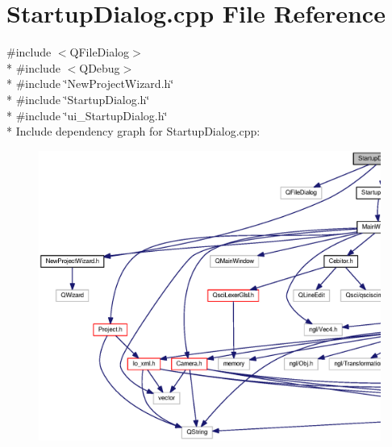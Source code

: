 \section{Startup\-Dialog.\-cpp File Reference}
\label{_startup_dialog_8cpp}
{\ttfamily \#include $<$Q\-File\-Dialog$>$}\\*
{\ttfamily \#include $<$Q\-Debug$>$}\\*
{\ttfamily \#include \char`\"{}New\-Project\-Wizard.\-h\char`\"{}}\\*
{\ttfamily \#include \char`\"{}Startup\-Dialog.\-h\char`\"{}}\\*
{\ttfamily \#include \char`\"{}ui\-\_\-\-Startup\-Dialog.\-h\char`\"{}}\\*
Include dependency graph for Startup\-Dialog.\-cpp\-:\nopagebreak
\begin{figure}[H]
\begin{center}
\leavevmode
\includegraphics[width=350pt]{_startup_dialog_8cpp__incl}
\end{center}
\end{figure}
